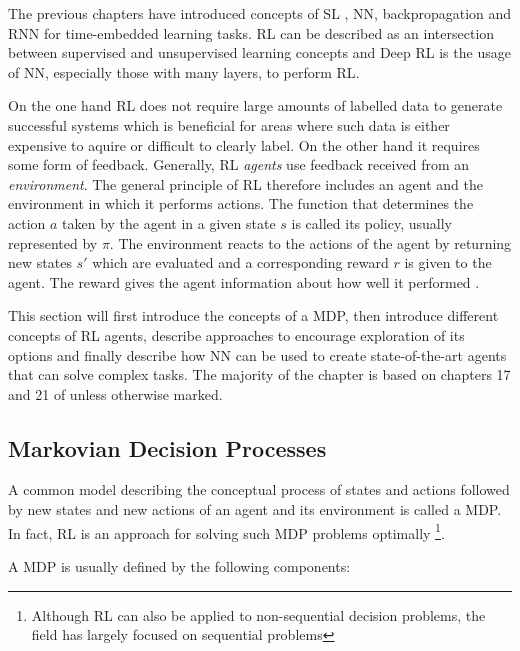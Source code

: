 The previous chapters have introduced concepts of \ac {SL} , \ac {NN}, backpropagation and \ac {RNN} for time-embedded
learning tasks. \ac {RL} can be described as an intersection between supervised and unsupervised learning concepts and
Deep \ac {RL} is the usage of \ac {NN}, especially those with many layers, to perform \ac {RL}.

On the one hand \ac {RL}  does not require large amounts of labelled data to generate successful systems which is
beneficial for areas where such data is either expensive to aquire or difficult to clearly label. On the other hand it
requires some form of feedback. Generally, \ac {RL} \emph{agents} use feedback received from an \emph{environment}.  The
general principle of \ac {RL} therefore includes an agent and the environment in which it performs actions. The function
that determines the action $a$  taken by the agent in a given state $s$ is called its policy, usually represented by
$\pi$.  The environment reacts to the actions of the agent by returning new states $s'$ which are evaluated and a
corresponding reward $r$ is given to the agent. The reward gives the agent information about how well it performed 
\citep[p.830f.]{russell2016artificial}.

This section will first introduce the concepts of a \ac {MDP}, then introduce different concepts of \ac {RL} agents,
describe approaches to encourage exploration of its options and finally describe how \ac {NN} can be used to create
state-of-the-art agents that can solve complex tasks. The majority of the chapter is based on
chapters 17 and 21 of \citet[]{russell2016artificial} unless otherwise marked. 

\subsection{Markovian Decision Processes}%
\label{ssub:markovian_decision_processes}

A common model describing the conceptual process of states and actions followed by new states and new actions of an
agent and its environment is called a \acf {MDP}. In fact, \ac {RL} is an approach for solving such \ac {MDP} problems
optimally
\footnote{Although \ac {RL} can also be applied to non-sequential decision problems, the field has largely focused on
sequential problems}.

A \ac {MDP} is usually defined by the following components:

